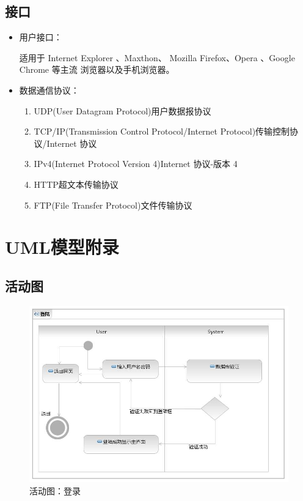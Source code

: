 \documentclass[a4paper,14pt]{ctexart}
\begin{document}
\subsection{接口}
\begin{itemize}
\item 用户接口：\par
适用于 Internet Explorer 、Maxthon、 Mozilla Firefox、Opera 、Google Chrome 等主流 浏览器以及手机浏览器。
\item 数据通信协议：\par
\begin{enumerate}[1)]
\item UDP(User Datagram Protocol)用户数据报协议
\item TCP/IP(Transmission Control Protocol/Internet Protocol)传输控制协议/Internet 协议 
\item IPv4(Internet Protocol Version 4)Internet 协议-版本 4 
\item HTTP超文本传输协议 
\item FTP(File Transfer Protocol)文件传输协议 
\end{enumerate}

\end{itemize}

\section{UML模型附录}
\subsection{活动图}
\begin{figure}[H]
\centering\includegraphics[width=4.5in]{活动图-登录.jpeg}
\caption{活动图：登录}
\end{figure}
\end{document}
